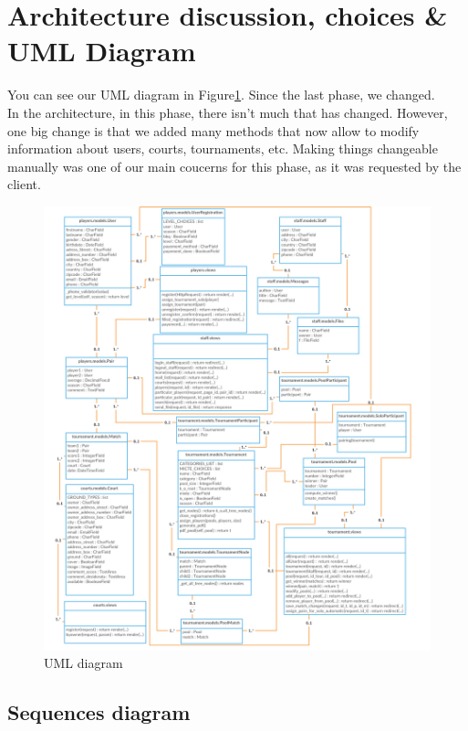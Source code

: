 \documentclass[a4paper, 12pt]{article}
\begin{document}
\newpage
\section{Architecture discussion, choices \& UML Diagram}

You can see our UML diagram in Figure\ref{uml}. Since the last phase, we changed.\\

In the architecture, in this phase, there isn't much that has changed. However, one big change is that we added many methods that now allow to modify information about users, courts, tournaments, etc. Making things changeable manually was one of our main coucerns for this phase, as it was requested by the client.

\begin{figure}[b]
	\centering
 	\caption{\label{uml} UML diagram}
	\includegraphics[scale=0.2]{Class.png}
\end{figure}

\subsection*{Sequences diagram}
\end{document}
